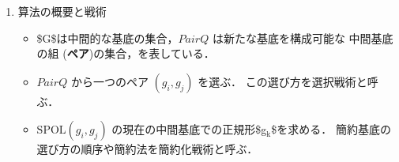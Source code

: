 \documentclass[a4j,12pt]{jarticle}
\begin{document}
{{\begin{enumerate}
\begin{quote}
Input: \$F = $\backslash${ f\(_{\text{1}}\), \ldots, f\(_{\text{l}}\)$\backslash$}\$\\
Output: Gröbner基底 \(G\) of \(Ideal(F)\)

\#+BEGIN\(_{\text{QUOTE}}\)
  \(PairQ \longleftarrow \phi\);\\
  \(G \longleftarrow \phi\);

\emph{foreach} (\(f_i \in F\)) \(\{\)

\#+BEGIN\(_{\text{QUOTE}}\)
  \$ PairQ \longleftarrow UpdatePairQ(PairQ, f\(_{\text{i}}\), F)\$;\\
  \$ G \longleftarrow UpdateBase(G, f\(_{\text{i}}\))\$;
\end{quote}

\(\}\)

\emph{while} ( \(PairQ \ne \phi\) ) \(\{\)

\begin{quote}
\((g_i, g_j) \longleftarrow\) \emph{select an element of \(PairQ\)};\\
\(PairQ \longleftarrow PairQ \setminus \{(g_i, g_j)\}\);\\
\(g_k \longleftarrow {{{\mathrm{SPOL}}(g_i, g_j)\!\downarrow_{G}}}\);

\emph{if} \$g\(_{\text{k}}\) \(\ne\) 0 \$ \(\{\)

\#+BEGIN\(_{\text{QUOTE}}\)
  \(PairQ \longleftarrow UpdateQ(PairQ, g_k, G)\);\\
  \(G \longleftarrow UpdateBase(G, g_k)\);
\end{quote}

  \(\}\)
\#+END\(_{\text{QUOTE}}\)

    \(\}\)
  \#+END\(_{\text{QUOTE}}\)
\#+END\(_{\text{QUOTE}}\)

\item 算法の概要と戦術
\label{sec:org0609778}

\begin{itemize}
\item \$G\$は中間的な基底の集合，\(PairQ\) は新たな基底を構成可能な
中間基底の組 (\textbf{ペア})の集合，を表している．

\item \(PairQ\) から一つのペア \((g_i, g_j)\) を選ぶ．
この選び方を選択戦術と呼ぶ．

\item \({\mathrm{SPOL}}(g_i, g_j)\) の現在の中間基底での正規形\$g\(_{\text{k}}\)\$を求める．
簡約基底の選び方の順序や簡約法を簡約化戦術と呼ぶ．


\end{itemize}
\end{enumerate}}}
\end{document}
